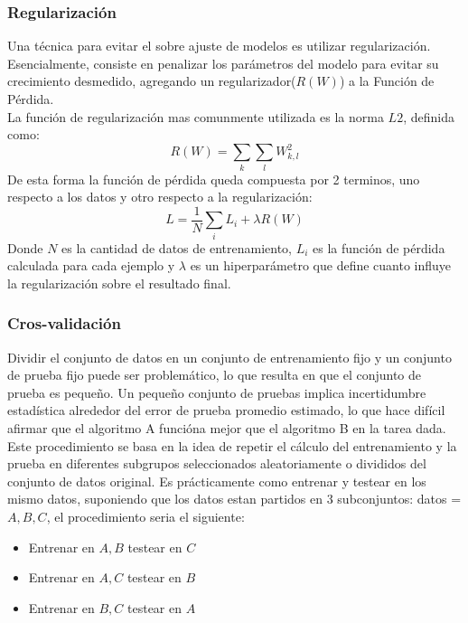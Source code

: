 \documentclass[a4paper,11pt,spanish]{book}
\begin{document}
	\subsubsection {Regularización}
	  Una técnica para evitar el sobre ajuste de modelos es utilizar regularización. Esencialmente, consiste en penalizar los parámetros del modelo para evitar su
	  crecimiento desmedido, agregando un regularizador($R(W)$) a la Función de Pérdida. \\
	  La función de regularización mas comunmente utilizada es la norma $L2$, definida como:
	   \begin{equation}
	    R(W) = {\sum_{k} {\sum_{l}} W_{k,l}^2}
	   \end{equation}
	   De esta forma la función de pérdida queda compuesta por 2 terminos, uno respecto a los datos y otro respecto a la regularización:
	   \begin{equation}
	    L = {\frac{1}{N}} {\sum_{i} L_{i}} + {\lambda R(W)}
	   \end{equation}
	   Donde $N$ es la cantidad de datos de entrenamiento, $L_{i}$ es la función de pérdida calculada para cada ejemplo y ${\lambda}$ es un hiperparámetro que define 
	   cuanto influye la regularización sobre el resultado final. 
	   
	\subsubsection {Cros-validación}
	  Dividir el conjunto de datos en un conjunto de entrenamiento fijo y un conjunto de prueba fijo puede ser problemático, lo que resulta en que el conjunto de prueba es pequeño. 
	  Un pequeño conjunto de pruebas implica incertidumbre estadística alrededor del error de prueba promedio estimado, lo que hace difícil afirmar que el algoritmo A funcióna mejor que el algoritmo B en la tarea dada.
	  Este procedimiento se basa en la idea de repetir el cálculo del entrenamiento y la prueba en diferentes subgrupos seleccionados aleatoriamente o divididos del conjunto de datos original.
	  Es prácticamente como entrenar y testear en los mismo datos, suponiendo que los datos estan partidos en 3 subconjuntos: datos = ${A,B,C}$, el procedimiento seria el siguiente:
	  \begin{itemize}
	    \item Entrenar en ${A,B}$ testear en ${C}$
	    \item Entrenar en ${A,C}$ testear en ${B}$
	    \item Entrenar en ${B,C}$ testear en ${A}$
	  \end{itemize}
\end{document}
